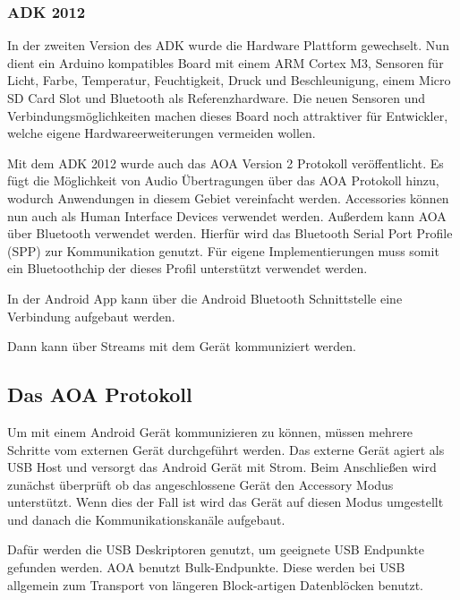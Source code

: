 \documentclass[12pt,journal,compsoc]{IEEEtran}
\begin{document}
\subsubsection{ADK 2012}
In der zweiten Version des ADK wurde die Hardware Plattform gewechselt. Nun dient ein Arduino kompatibles Board mit einem ARM Cortex M3, Sensoren für Licht, Farbe, Temperatur, Feuchtigkeit, Druck und Beschleunigung, einem Micro SD Card Slot und Bluetooth als Referenzhardware.
Die neuen Sensoren und Verbindungsmöglichkeiten machen dieses Board noch attraktiver für Entwickler, welche eigene Hardwareerweiterungen vermeiden wollen.

Mit dem ADK 2012 wurde auch das AOA Version 2 Protokoll veröffentlicht.
Es fügt die Möglichkeit von Audio Übertragungen über das AOA Protokoll hinzu, wodurch Anwendungen in diesem Gebiet vereinfacht werden.
Accessories können nun auch als Human Interface Devices verwendet werden.
Außerdem kann AOA über Bluetooth verwendet werden. Hierfür wird das Bluetooth Serial Port Profile (SPP) zur Kommunikation genutzt. Für eigene Implementierungen muss somit ein Bluetoothchip der dieses Profil unterstützt verwendet werden.


In der Android App kann über die Android Bluetooth Schnittstelle eine Verbindung aufgebaut werden.

Dann kann über Streams mit dem Gerät kommuniziert werden.

\subsection{Das AOA Protokoll}
Um mit einem Android Gerät kommunizieren zu können, müssen mehrere Schritte vom externen Gerät durchgeführt werden.
Das externe Gerät agiert als USB Host und versorgt das Android Gerät mit Strom.
Beim Anschließen wird zunächst überprüft ob das angeschlossene Gerät den Accessory Modus unterstützt.
Wenn dies der Fall ist wird das Gerät auf diesen Modus umgestellt und danach die Kommunikationskanäle aufgebaut.

Dafür werden die USB Deskriptoren genutzt, um geeignete USB Endpunkte gefunden werden. AOA benutzt Bulk-Endpunkte. Diese werden bei USB allgemein zum Transport von längeren Block-artigen Datenblöcken benutzt.
\end{document}
